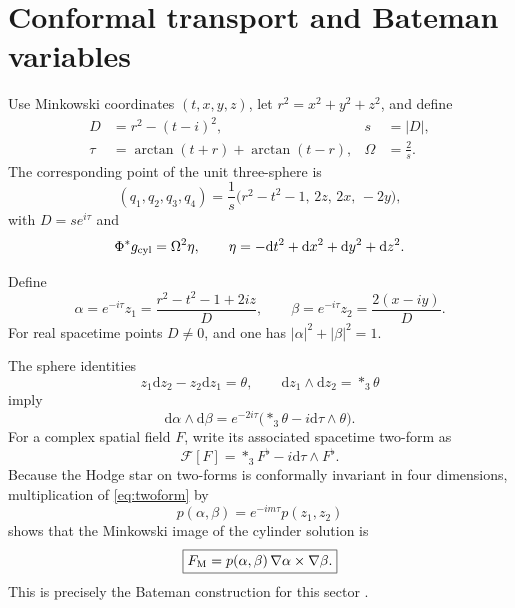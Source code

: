 \documentclass[11pt,a4paper]{article}
\numberwithin{equation}{section}
\theoremstyle{remark}
\newcommand{\dd}{\mathrm{d}}
\newcommand{\cF}{\mathcal{F}}
\begin{document}
\section{Conformal transport and Bateman variables}

Use Minkowski coordinates \((t,x,y,z)\), let \(r^2=x^2+y^2+z^2\), and define
\begin{align}
 D&=r^2-(t-i)^2,
 &s&=|D|,\nonumber\\
 \tau&=\arctan(t+r)+\arctan(t-r),
 &\Omega&=\frac{2}{s}.
\end{align}
The corresponding point of the unit three-sphere is
\begin{equation}\label{eq:compact}
 (q_1,q_2,q_3,q_4)
 =\frac1s\bigl(r^2-t^2-1,\,2z,\,2x,\,-2y\bigr),
\end{equation}
with \(D=se^{i\tau}\) and
\begin{equation}
 \Phi^*g_{\rm cyl}=\Omega^2\eta,
 \qquad
 \eta=-\dd t^2+\dd x^2+\dd y^2+\dd z^2.
\end{equation}

Define
\begin{equation}\label{eq:bateman}
 \alpha=e^{-i\tau}z_1
 =\frac{r^2-t^2-1+2iz}{D},
 \qquad
 \beta=e^{-i\tau}z_2
 =\frac{2(x-iy)}{D}.
\end{equation}
For real spacetime points \(D\neq0\), and one has \(|\alpha|^2+|\beta|^2=1\).

The sphere identities
\begin{equation}\label{eq:sphereforms}
 z_1\dd z_2-z_2\dd z_1=\theta,
 \qquad
 \dd z_1\wedge\dd z_2=*_{3}\theta
\end{equation}
imply
\begin{equation}\label{eq:twoform}
 \dd\alpha\wedge\dd\beta
 =e^{-2i\tau}\bigl(*_3\theta-i\dd\tau\wedge\theta\bigr).
\end{equation}
For a complex spatial field \(F\), write its associated spacetime two-form as
\begin{equation}
 \cF[F]=*_3F^\flat-i\dd\tau\wedge F^\flat.
\end{equation}
Because the Hodge star on two-forms is conformally invariant in four dimensions, multiplication of \eqref{eq:twoform} by
\[
 p(\alpha,\beta)=e^{-im\tau}p(z_1,z_2)
\]
shows that the Minkowski image of the cylinder solution is
\begin{equation}\label{eq:flat}
 \boxed{
 F_{\rm M}=p(\alpha,\beta)\,\nabla\alpha\times\nabla\beta .}
\end{equation}
This is precisely the Bateman construction for this sector \cite{Kedia2013}.
\end{document}
